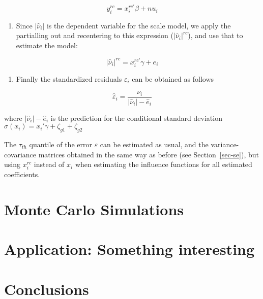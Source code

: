 \documentclass[
  authoryear,
  preprint,
  1p]{elsarticle}
\providecommand{\tightlist}{%
  \setlength{\itemsep}{0pt}\setlength{\parskip}{0pt}}\usepackage{longtable,booktabs,array}
\begin{document}
\[y_{i}^{rc} = x_{i}^{rc'} \beta + nu_{i}
\]

\begin{enumerate}
\def\labelenumi{\arabic{enumi}.}
\setcounter{enumi}{2}
\tightlist
\item
  Since \(|\hat \nu_i|\) is the dependent variable for the scale model,
  we apply the partialling out and recentering to this expression
  (\(|\hat \nu_i|^{rc}\)), and use that to estimate the model:
\end{enumerate}

\[|\hat\nu_{i}|^{rc} = x_{i}^{rc'} \gamma + e_{i}\]

\begin{enumerate}
\def\labelenumi{\arabic{enumi}.}
\setcounter{enumi}{3}
\tightlist
\item
  Finally the standardized residuals \(\varepsilon_i\) can be obtained
  as follows
\end{enumerate}

\[\hat{\varepsilon}_{i} = \frac{\nu_{i}}{|\hat\nu_{i}|- \hat e_{i}}\]

where \(|\hat\nu_{i}|- \hat e_{i}\) is the prediction for the
conditional standard deviation
\(\sigma(x_i)=x_{i}' \gamma + \zeta_{g1} + \zeta_{g2}\)

The \(\tau_{th}\) quantile of the error \(\varepsilon\) can be estimated
as usual, and the variance-covariance matrices obtained in the same way
as before (see Section~\ref{sec-se}), but using \(x_{i}^{rc}\) instead
of \(x_{i}\) when estimating the influence functions for all estimated
coefficients.

\hypertarget{monte-carlo-simulations}{%
\section{Monte Carlo Simulations}\label{monte-carlo-simulations}}

\hypertarget{application-something-interesting}{%
\section{\texorpdfstring{Application: \textbf{Something
interesting}}{Application: Something interesting}}\label{application-something-interesting}}

\hypertarget{conclusions}{%
\section{Conclusions}\label{conclusions}}
\end{document}
